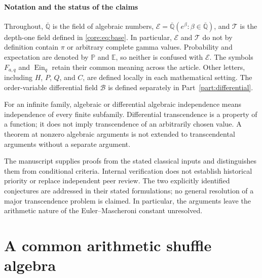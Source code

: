 \documentclass[11pt,a4paper]{article}
\newcommand{\Qbar}{\overline{\mathbb Q}}
\newcommand{\E}{\mathcal E}
\newcommand{\T}{\mathcal T}
\newcommand{\B}{\mathscr B}
\DeclareMathOperator{\Ein}{Ein}
\theoremstyle{definition}
\theoremstyle{remark}
\numberwithin{equation}{section}
\begin{document}
\subsection{Notation and the status of the claims}
Throughout, $\Qbar$ is the field of algebraic numbers,
$\E=\Qbar(e^\beta:\beta\in\Qbar)$, and $\T$ is the depth-one
field defined in \eqref{core:eq:base}. In particular, $\E$ and $\T$
do not by definition contain $\pi$ or arbitrary complete gamma values.
Probability and expectation are denoted by $\mathbb P$ and
$\mathbb E$, so neither is confused with $\E$.
The symbols $F_{a,q}$ and $\Ein_q$ retain their common meaning across
the article. Other letters, including $H$, $P$, $Q$, and $C$, are
defined locally in each mathematical setting. The order-variable
differential field $\B$ is defined separately in Part~\ref{part:differential}.

For an infinite family, algebraic or differential algebraic independence
means independence of every finite subfamily. Differential transcendence
is a property of a function; it does not imply transcendence of an
arbitrarily chosen value. A theorem at nonzero algebraic arguments is
not extended to transcendental arguments without a separate argument.

The manuscript supplies proofs from the stated classical inputs and
distinguishes them from conditional criteria. Internal verification
does not establish historical priority or replace independent peer
review. The two explicitly identified conjectures are addressed in
their stated formulations; no general resolution of a major
transcendence problem is claimed. In particular, the arguments leave
the arithmetic nature of the Euler--Mascheroni constant unresolved.



\clearpage
\part{A common arithmetic shuffle algebra}\label{part:core}
\end{document}
